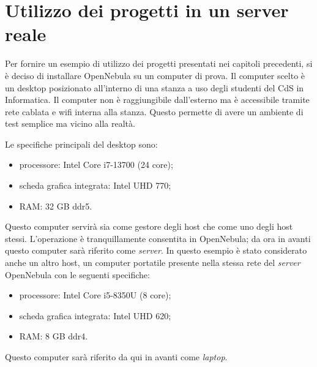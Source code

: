 
\chapter{Utilizzo dei progetti in un server reale}
\label{cap:capitolo4}
Per fornire un esempio di utilizzo dei progetti presentati nei capitoli precedenti, si è deciso di installare OpenNebula su un computer di prova. Il computer scelto è un desktop posizionato all'interno di una stanza a uso degli studenti del CdS in Informatica. Il computer non è raggiungibile dall'esterno ma è accessibile tramite rete cablata e wifi interna alla stanza. Questo permette di avere un ambiente di test semplice ma vicino alla realtà.\par
Le specifiche principali del desktop sono:
\begin{itemize}
    \item processore: Intel Core i7-13700 (24 core);
    \item scheda grafica integrata: Intel UHD 770;
    \item RAM: 32 GB ddr5.
\end{itemize}
Questo computer servirà sia come gestore degli host che come uno degli host stessi. L'operazione è tranquillamente consentita in OpenNebula; da ora in avanti questo computer sarà riferito come \emph{server}.
In questo esempio è stato considerato anche un altro host, un computer portatile presente nella stessa rete del \emph{server} OpenNebula con le seguenti specifiche:
\begin{itemize}
    \item processore: Intel Core i5-8350U (8 core);
    \item scheda grafica integrata: Intel UHD 620;
    \item RAM: 8 GB ddr4.
\end{itemize}
Questo computer sarà riferito da qui in avanti come \emph{laptop}.\par


